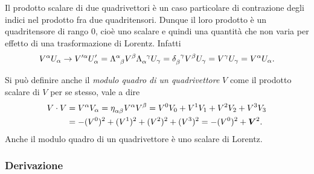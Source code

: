Il prodotto scalare di due quadrivettori è un caso particolare di contrazione
degli indici nel prodotto fra due quadritensori.  Dunque il loro prodotto è un
quadritensore di rango $0$, cioè uno scalare e quindi una quantità che non varia
per effetto di una trasformazione di Lorentz.  Infatti
\begin{equation}
  V^{\alpha}U_{\alpha} \to V'^{\alpha}U'_{\alpha} =
  \tensor{\Lambda}{^{\alpha}_{\beta}} V^{\beta}
  \tensor{\Lambda}{_{\alpha}^{\gamma}} U_{\gamma} =
  \tensor{\delta}{_{\beta}^{\gamma}} V^{\beta} U_{\gamma} = V^{\gamma}U_{\gamma}
  = V^{\alpha} U_{\alpha}.
\end{equation}

Si può definire anche il 
\emph{modulo quadro di un quadrivettore} $V$ come il prodotto scalare di $V$ per
se stesso, vale a dire
\begin{equation}
  \begin{split}
    V\cdot V &= V^{\alpha}V_{\alpha} =
    \tensor{\eta}{_{\alpha\beta}}V^{\alpha}V^{\beta} = V^{0}V_{0} + V^{1}V_{1} +
    V^{2}V_{2} + V^{3}V_{3} \\
    &= -(V^{0})^{2} + (V^{1})^{2} + (V^{2})^{2} + (V^{3})^{2} = -(V^{0})^{2} +
    \bm{V}^{2}.
  \end{split}
\end{equation}
Anche il modulo quadro di un quadrivettore è uno scalare di Lorentz.

\subsubsection{Derivazione}
\label{sec:derivazione-minkowski}

